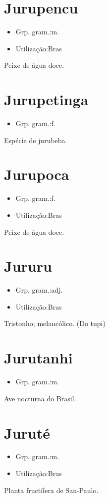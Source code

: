 \documentclass{article}
\begin{document}
\section{Jurupencu}
\begin{itemize}
\item {Grp. gram.:m.}
\end{itemize}
\begin{itemize}
\item {Utilização:Bras}
\end{itemize}
Peixe de água doce.
\section{Jurupetinga}
\begin{itemize}
\item {Grp. gram.:f.}
\end{itemize}
Espécie de jurubeba.
\section{Jurupoca}
\begin{itemize}
\item {Grp. gram.:f.}
\end{itemize}
\begin{itemize}
\item {Utilização:Bras}
\end{itemize}
Peixe de água doce.
\section{Jururu}
\begin{itemize}
\item {Grp. gram.:adj.}
\end{itemize}
\begin{itemize}
\item {Utilização:Bras}
\end{itemize}
Tristonho; melancólico.
(Do tupi)
\section{Jurutanhi}
\begin{itemize}
\item {Grp. gram.:m.}
\end{itemize}
Ave nocturna do Brasil.
\section{Juruté}
\begin{itemize}
\item {Grp. gram.:m.}
\end{itemize}
\begin{itemize}
\item {Utilização:Bras}
\end{itemize}
Planta fructífera de San-Paulo.
\end{document}
